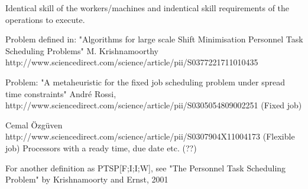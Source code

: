Identical skill of the workers/machines and indentical skill requirements of the operations to execute.

Problem defined in: "Algorithms for large scale Shift Minimisation Personnel Task Scheduling Problems" M. Krishnamoorthy
http://www.sciencedirect.com/science/article/pii/S0377221711010435

Problem: "A metaheuristic for the fixed job scheduling problem under spread time constraints" André Rossi, http://www.sciencedirect.com/science/article/pii/S0305054809002251 (Fixed job)

Cemal Özgüven
http://www.sciencedirect.com/science/article/pii/S0307904X11004173 (Flexible job)
Processors with a ready time, due date etc. (??)

For another definition as PTSP[F;I;I;W], see "The Personnel Task Scheduling Problem" by Krishnamoorty and Ernst, 2001





